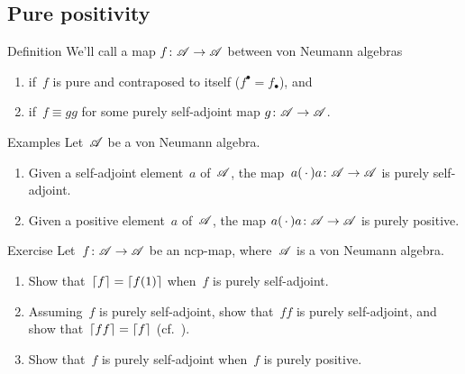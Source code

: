 \documentclass[a]{subfiles}
\begin{document}
\subsection{Pure positivity}
\begin{parsec}%
\begin{point}{Definition}%
We'll call a map $f\colon \mathscr{A}\to\mathscr{A}$
between von Neumann algebras
\begin{enumerate}
\item
{}
if~$f$ is pure and contraposed to itself
($f^\bullet = f_\bullet$), and
\item
{}
if~$f\equiv gg$
for some purely self-adjoint map
$g\colon \mathscr{A}\to\mathscr{A}$.
\end{enumerate}
\end{point}
\begin{point}{Examples}%
Let~$\mathscr{A}$ be a von Neumann algebra.
\begin{enumerate}
\item
Given a self-adjoint element~$a$ of~$\mathscr{A}$,
the map~$a(\,\cdot\,)a\colon \mathscr{A}\to\mathscr{A}$ is 
purely self-adjoint.
\item
Given a positive element~$a$ of~$\mathscr{A}$,
the map $a(\,\cdot\,)a\colon \mathscr{A}\to\mathscr{A}$
is purely positive.
\end{enumerate}
\end{point}
\begin{point}{Exercise}%
Let~$f\colon \mathscr{A}\to\mathscr{A}$
be an ncp-map,
where~$\mathscr{A}$ is a von Neumann algebra.
\begin{enumerate}
\item
Show that~$\left\lceil f\right\rceil=\left\lceil f(1)\right\rceil$ when~$f$
is purely self-adjoint.
\item
Assuming~$f$ is purely self-adjoint,
show that~$ff$ is purely self-adjoint,
and show that~$\left\lceil ff\right\rceil=\left\lceil f\right\rceil$ (cf.~).
\item
Show that~$f$ is purely self-adjoint
when~$f$ is purely positive.
\end{enumerate}
\end{point}
\end{parsec}
\end{document}
